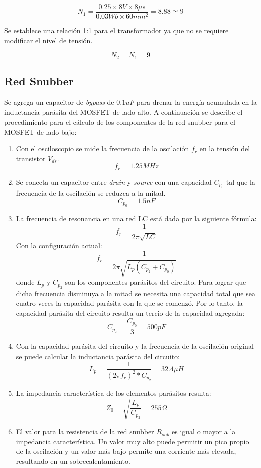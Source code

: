 $$ N_{1}=\frac {0.25\times 8V \times 8\mu s}{0.03Wb \times 60mm^2}=8.88\simeq 9 $$

Se establece una relación 1:1 para el transformador ya que no se requiere modificar el nivel de tensión.

$$ N_{2}=N_{1}=9 $$

\subsection{Red Snubber}

Se agrega un capacitor de \textit{bypass} de $0.1uF$ para drenar la energía acumulada en la inductancia parásita del MOSFET de lado alto.   
A continuación se describe el procedimiento para el cálculo de los componentes de la red snubber para el MOSFET de lado bajo:

\begin{enumerate}
    \item Con el osciloscopio se mide la frecuencia de la oscilación $f_{r}$ en la tensión del transistor $V_{ds}$. 
    $$ f_{r}=1.25MHz $$ 
    \item Se conecta un capacitor entre \textit{drain} y \textit{source} con una capacidad $C_{p_{0}}$ tal que la frecuencia de la oscilación se reduzca a la mitad. 
    $$ C_{p_{0}}=1.5nF $$
    \item La frecuencia de resonancia en una red LC está dada por la siguiente fórmula:
    $$ f_{r}=\frac{1}{2\pi\sqrt{LC}} $$
    Con la configuración actual: 
    $$ f_{r}=\frac{1}{2\pi\sqrt{L_{p}(C_{p_{2}}+C_{p_{0}})}} $$
    donde $L_{p}$ y $C_{p_2}$ son los componentes parásitos del circuito.
    Para lograr que dicha frecuencia disminuya a la mitad se necesita una capacidad total que sea cuatro veces la capacidad parásita con la que se comenzó.
    Por lo tanto, la capacidad parásita del circuito resulta un tercio de la capacidad agregada:
    $$ C_{p_{2}} = \frac{C_{p_{0}}}{3}=500pF $$
    \item Con la capacidad parásita del circuito y la frecuencia de la oscilación original se puede calcular la inductancia parásita del circuito:
    $$ L_{p}=\frac{1}{(2\pi f_{r})^{2}*C_{p_{2}}}=32.4\mu H $$
    \item La impedancia característica de los elementos parásitos resulta:
    $$ Z_{0}=\sqrt{\frac{L_p}{C_{p_2}}}=255\Omega $$
\item El valor para la resistencia de la red snubber $R_{snb}$ es igual o mayor a la impedancia característica. 
Un valor muy alto puede permitir un pico propio de la oscilación y un valor más bajo permite una corriente más elevada, resultando en un sobrecalentamiento.

\end{enumerate}
